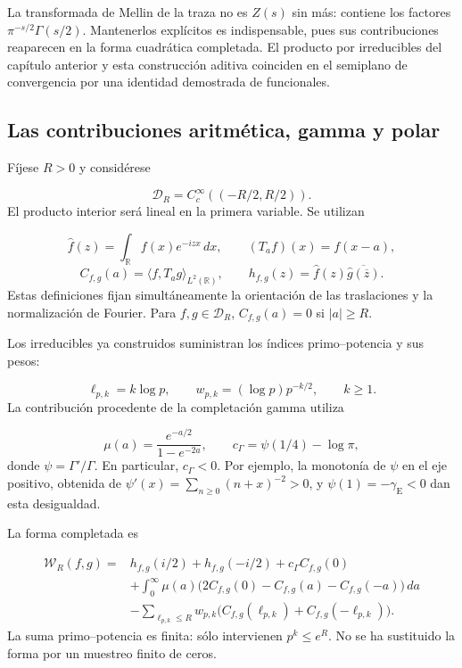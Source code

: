 La transformada de Mellin de la traza no es \(Z(s)\) sin más: contiene los factores \(\pi^{-s/2}\Gamma(s/2)\). Mantenerlos explícitos es indispensable, pues sus contribuciones reaparecen en la forma cuadrática completada. El producto por irreducibles del capítulo anterior y esta construcción aditiva coinciden en el semiplano de convergencia por una identidad demostrada de funcionales.

\subsection{Las contribuciones aritmética, gamma y polar}
\label{viii:rz:forma}
Fíjese \(R>0\) y considérese

\[
\mathcal D_R=C_c^\infty((-R/2,R/2)).
\]
El producto interior será lineal en la primera variable. Se utilizan

\[
\widehat f(z)=\int_{\mathbb R}f(x)e^{-izx}\,dx,\qquad
(T_af)(x)=f(x-a),
\]
\[
C_{f,g}(a)=\langle f,T_ag\rangle_{L^2(\mathbb R)},\qquad
h_{f,g}(z)=\widehat f(z)\overline{\widehat g(\overline z)}.
\]
Estas definiciones fijan simultáneamente la orientación de las traslaciones y la normalización de Fourier. Para \(f,g\in\mathcal D_R\), \(C_{f,g}(a)=0\) si \(|a|\geq R\).

Los irreducibles ya construidos suministran los índices primo–potencia y sus pesos:

\[
\ell_{p,k}=k\log p,\qquad
w_{p,k}=(\log p)p^{-k/2},\qquad k\geq1.
\]
La contribución procedente de la completación gamma utiliza

\[
\mu(a)=\frac{e^{-a/2}}{1-e^{-2a}},\qquad
c_\Gamma=\psi(1/4)-\log\pi,
\]
donde \(\psi=\Gamma'/\Gamma\). En particular, \(c_\Gamma<0\). Por ejemplo, la monotonía de \(\psi\) en el eje positivo, obtenida de \(\psi'(x)=\sum_{n\geq0}(n+x)^{-2}>0\), y \(\psi(1)=-\gamma_{\mathrm E}<0\) dan esta desigualdad.

La forma completada es

\[
\begin{aligned}
\mathscr W_R(f,g)={}&h_{f,g}(i/2)+h_{f,g}(-i/2)
+c_\Gamma C_{f,g}(0)\\
&+\int_0^\infty\mu(a)
\bigl(2C_{f,g}(0)-C_{f,g}(a)-C_{f,g}(-a)\bigr)\,da\\
&-\sum_{\ell_{p,k}\leq R}w_{p,k}
\bigl(C_{f,g}(\ell_{p,k})+C_{f,g}(-\ell_{p,k})\bigr).
\end{aligned}
\]
La suma primo–potencia es finita: sólo intervienen \(p^k\leq e^R\). No se ha sustituido la forma por un muestreo finito de ceros.

